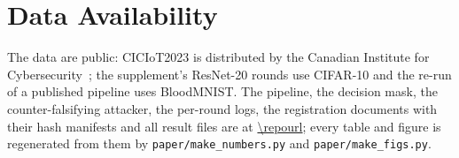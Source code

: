 
\section*{Data Availability}

The data are public: CICIoT2023 is distributed by the Canadian Institute for
Cybersecurity~\cite{neto2023ciciot}; the supplement's ResNet-20 rounds use CIFAR-10 and the
re-run of a published pipeline uses BloodMNIST.
The pipeline, the decision mask, the counter-falsifying attacker, the per-round logs,
the registration documents with their hash manifests and all result files are at
\url{\repourl}; every table and figure is regenerated from them by
\texttt{paper/make\_numbers.py} and \texttt{paper/make\_figs.py}.
